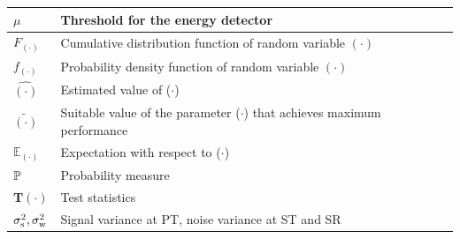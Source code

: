 \begin{table}
\begin{tabular}{p{}||p{}}
$\mu$ & Threshold for the energy detector\\ \hline
$F_{(\cdot)}$ & Cumulative distribution function of random variable $(\cdot)$\\ \hline
$f_{(\cdot)}$ & Probability density function of random variable $(\cdot)$\\ \hline
$\hat{(\cdot)}$ & Estimated value of ($\cdot$)\\ \hline
$\tilde{(\cdot)}$ & Suitable value of the parameter ($\cdot$) that achieves maximum performance \\ \hline
$\mathbb E_{(\cdot)}$ & Expectation with respect to ($\cdot$) \\ \hline
$\mathbb P$ & Probability measure \\ \hline
\textbf{T}$(\cdot)$ & Test statistics\\ \hline
$\sigma^2_{\text{s}},  \sigma^2_{\text{w}}$ & Signal variance at PT, noise variance at ST and SR\\ \hline
\end{tabular}
\end{table}
 

